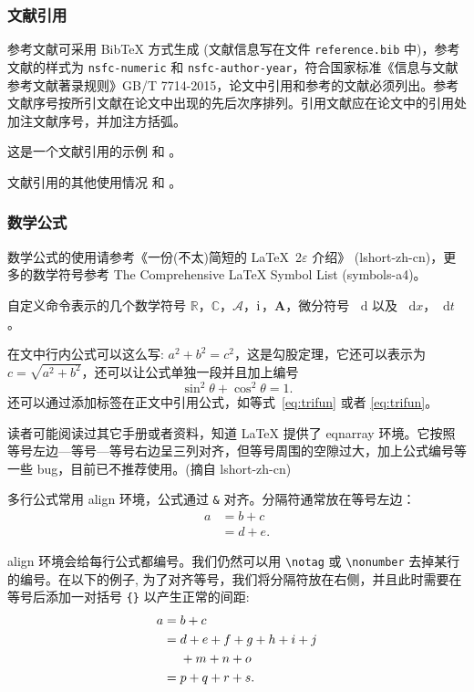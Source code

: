 \documentclass[YF]{nsfc}
\newcommand*{\dif}{\mathop{}\!\mathrm{d}}
\newcommand{\CC}{\ensuremath{\mathbb{C}}}
\newcommand{\RR}{\ensuremath{\mathbb{R}}}
\newcommand{\A}{\mathcal{A}}
\newcommand{\bA}{\boldsymbol{A}}
\newcommand{\ii}{\mathrm{i}\mkern1mu}
\newcommand{\dx}[1][x]{\mathop{}\!\mathrm{d}#1}
\begin{document}
\subsubsection{文献引用}

参考文献可采用 BibTeX 方式生成 (文献信息写在文件 \verb|reference.bib| 中)，参考文献的样式为 \verb|nsfc-numeric| 和 \verb|nsfc-author-year|，符合国家标准《信息与文献参考文献著录规则》GB/T 7714-2015，论文中引用和参考的文献必须列出。参考文献序号按所引文献在论文中出现的先后次序排列。引用文献应在论文中的引用处加注文献序号，并加注方括弧。

这是一个文献引用的示例 \cite{Tadmor2012} 和 \cite{LiLiu1997,Adams2003,TreWei2014}。

文献引用的其他使用情况 \cite[定理~1.1]{LiLiu1997} 和 \cite{Shen1994,LiuEtAl2024}。

\subsubsection{数学公式}

数学公式的使用请参考《一份(不太)简短的 \LaTeX~2$\varepsilon$ 介绍》 (lshort-zh-cn)，更多的数学符号参考 The Comprehensive LaTeX Symbol List (symbols-a4)。

自定义命令表示的几个数学符号 $\RR$，$\CC$，$\A$，$\ii$，$\bA$，微分符号 $\dif$ 以及 $\dx$，$\dx[t]$。

在文中行内公式可以这么写: $a^2+b^2=c^2$，这是勾股定理，它还可以表示为 $c=\sqrt{a^2+b^2}$，还可以让公式单独一段并且加上编号
\begin{equation}\label{eq:trifun}
\sin^2{\theta}+\cos^2{\theta}=1.
\end{equation}
还可以通过添加标签在正文中引用公式，如等式~\eqref{eq:trifun} 或者 \ref{eq:trifun}。

读者可能阅读过其它手册或者资料，知道 LaTeX 提供了 eqnarray 环境。它按照等号左边—等号—等号右边呈三列对齐，但等号周围的空隙过大，加上公式编号等一些 bug，目前已不推荐使用。(摘自 lshort-zh-cn)

多行公式常用 align 环境，公式通过 \verb|&| 对齐。分隔符通常放在等号左边：
\begin{align}
a & = b + c \\
& = d + e.
\end{align}

align 环境会给每行公式都编号。我们仍然可以用 \verb|\notag| 或 \verb|\nonumber| 去掉某行的编号。在以下的例子,
为了对齐等号，我们将分隔符放在右侧，并且此时需要在等号后添加一对括号 \verb|{}| 以产生正常的间距:
\begin{align}
a ={} & b + c \\
={} & d + e + f + g + h + i + j \notag \\
& + m + n + o \\
={} & p + q + r + s.
\end{align}
\end{document}

